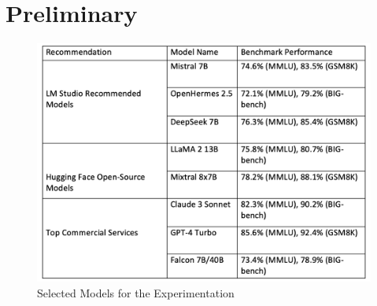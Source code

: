\documentclass[conference]{IEEEtran}
\begin{document}
\section{Preliminary}
\begin{figure}[h]
    \centering
\includegraphics[width=\linewidth]{Fig/Selected_LLM.png}
    \caption{Selected Models for the Experimentation}
    \label{fig:enter-label}
\end{figure}
\end{document}
